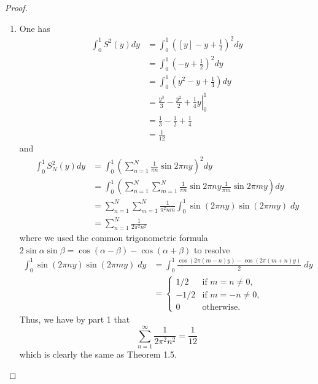 \documentclass[12pt]{article}
\begin{document}
\begin{proof}
\begin{enumerate}
\item One has
\begin{align*}
\int_0^1 S^2(y) dy &= \int_0^1 \left([y] - y + \frac12 \right)^2 dy\\
&= \int_0^1 \left(- y + \frac12 \right)^2 dy\\
&= \int_0^1 \left(y^2 - y + \frac14 \right) dy\\
&= \left.\frac{y^3}{3} - \frac{y^2}{2} + \frac14y \right|_0^1\\
&= \frac{1}{3} - \frac{1}{2} + \frac14\\
&= \frac{1}{12}
\end{align*}
and
\begin{align*}
\int_0^1 S_N^2(y) dy &= \int_0^1 \left( \sum_{n=1}^{N} \frac{1}{\pi n} \sin 2 \pi n y \right)^2 dy\\
&= \int_0^1 \left( \sum_{n=1}^{N} \sum_{m=1}^{N} \frac{1}{\pi n} \sin 2 \pi n y \frac{1}{\pi m} \sin 2 \pi m y \right) dy\\
&= \sum_{n=1}^{N} \sum_{m=1}^{N} \frac{1}{\pi^2 n m} \int_0^1 \sin (2 \pi n y) \sin(2\pi m y) \; dy\\
&= \sum_{n=1}^{N} \frac{1}{2 \pi^2 n^2}
\end{align*}
where we used the common trigonometric formula $2 \sin \alpha \sin \beta = \cos(\alpha - \beta) - \cos(\alpha + \beta)$ to resolve
\begin{align*}
\int_0^1 \sin (2 \pi n y) \sin(2\pi m y) \; dy &= \int_0^1 \frac{\cos (2 \pi (m - n) y) - \cos(2\pi (m + n) y)}{2} \; dy\\
&= \begin{cases}
1/2 &\text{if } m = n \not= 0,\\
-1/2 &\text{if } m = -n \not= 0,\\
0 &\text{otherwise.}
\end{cases}
\end{align*}
Thus, we have by part 1 that
$$\sum_{n=1}^{\infty} \frac{1}{2 \pi^2 n^2} = \frac{1}{12}$$
which is clearly the same as Theorem 1.5.
\end{enumerate}
\end{proof}

\unless\ifdefined\IsMainDocument
\end{document}
